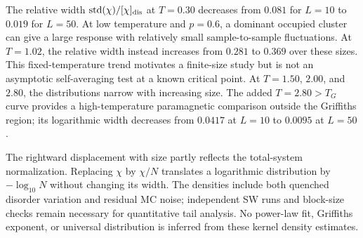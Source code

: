 \documentclass[a4paper,11pt]{article}
\begin{document}
The relative width $\operatorname{std}(\chi)/[\chi]_{\rm dis}$ at $T=0.30$ decreases from $0.081$
for $L=10$ to $0.019$ for $L=50$. At low temperature and $p=0.6$, a dominant occupied cluster
can give a large response with relatively small sample-to-sample fluctuations. At $T=1.02$, the
relative width instead increases from $0.281$ to $0.369$ over these sizes. This fixed-temperature
trend motivates a finite-size study but is not an asymptotic self-averaging test at a known critical
point. At $T=1.50$, $2.00$, and $2.80$, the distributions narrow with increasing size.
The added $T=2.80>T_G$ curve provides a high-temperature paramagnetic comparison outside the
Griffiths region; its logarithmic width decreases from $0.0417$ at $L=10$ to $0.0095$ at $L=50$.

The rightward displacement with size partly reflects the total-system normalization. Replacing
$\chi$ by $\chi/N$ translates a logarithmic distribution by $-\log_{10}N$ without changing its
width. The densities include both quenched disorder variation and residual MC noise; independent
SW runs and block-size checks remain necessary for quantitative tail analysis. No power-law fit,
Griffiths exponent, or universal distribution is inferred from these kernel density estimates.

\clearpage
\end{document}

